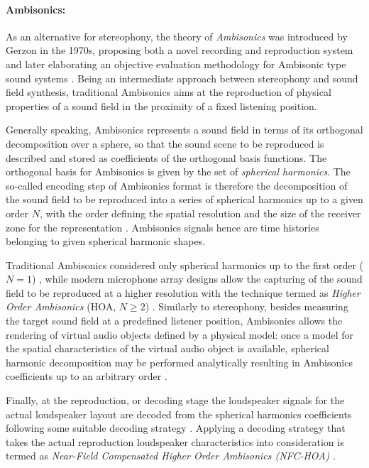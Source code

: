 \paragraph{Ambisonics:}
As an alternative for stereophony, the theory of \emph{Ambisonics} was introduced by Gerzon in the 1970s, proposing both a novel recording and reproduction system \cite{gerzon1973periphony} and later elaborating an objective evaluation methodology for Ambisonic type sound systems \cite{gerzon1992general}.
Being an intermediate approach between stereophony and sound field synthesis, traditional Ambisonics aims at the reproduction of physical properties of a sound field in the proximity of a fixed listening position.

Generally speaking, Ambisonics represents a sound field in terms of its orthogonal decomposition over a sphere, so that the sound scene to be reproduced is described and stored as coefficients of the orthogonal basis functions.
The orthogonal basis for Ambisonics is given by the set of \emph{spherical harmonics}.
The so-called encoding step of Ambisonics format is therefore the decomposition of the sound field to be reproduced into a series of spherical harmonics up to a given order $N$, with the order defining the spatial resolution and the size of the receiver zone for the representation \cite{gerzon1985ambisonics}.
Ambisonics signals hence are time histories belonging to given spherical harmonic shapes.

Traditional Ambisonics considered only spherical harmonics up to the first order ($N = 1$) \cite{gerzon1975the}, while modern microphone array designs allow the capturing of the sound field to be reproduced at a higher resolution with the technique termed as \emph{Higher Order Ambisonics} (HOA, $N \geq 2$) \cite{5745011, 5744968, 5356221}.
Similarly to stereophony, besides measuring the target sound field at a predefined listener position, Ambisonics allows the rendering of virtual audio objects defined by a physical model:
once a model for the spatial characteristics of the virtual audio object is available, spherical harmonic decomposition may be performed analytically resulting in Ambisonics coefficients up to an arbitrary order \cite{4517624, Ahrens2010phd}.

Finally, at the reproduction, or decoding stage the loudspeaker signals for the actual loudspeaker layout are decoded from the spherical harmonics coefficients following some suitable decoding strategy \cite{Daniel2000:phd, Daniel2003b, zotter:hal-01106738, zotter2012all, zotter2018ambisonic}.
Applying a decoding strategy that takes the actual reproduction loudspeaker characteristics into consideration is termed as \emph{Near-Field Compensated Higher Order Ambisonics (NFC-HOA)} \cite{Daniel2003}.

